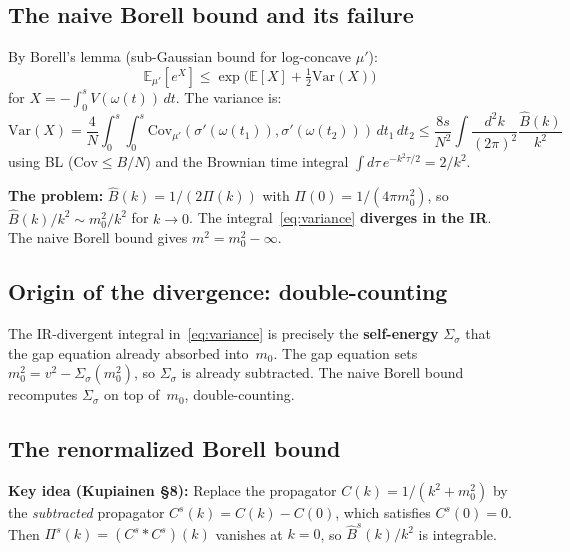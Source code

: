 \documentclass[12pt]{article}
\theoremstyle{definition}
\theoremstyle{remark}
\newcommand{\E}{\mathbb{E}}
\newcommand{\Var}{\mathrm{Var}}
\newcommand{\Cov}{\mathrm{Cov}}
\begin{document}
\subsection{The naive Borell bound and its failure}

By Borell's lemma (sub-Gaussian bound for log-concave $\mu'$):
\begin{equation}
  \E_{\mu'}[e^X] \le \exp\bigl(\E[X]+\tfrac{1}{2}\Var(X)\bigr)
\end{equation}
for $X = -\int_0^s V(\omega(t))\,dt$. The variance is:
\begin{equation}
\label{eq:variance}
  \Var(X) = \frac{4}{N}\!\int_0^s\!\!\!\int_0^s\!
    \Cov_{\mu'}(\sigma'(\omega(t_1)),\sigma'(\omega(t_2)))
    \,dt_1\,dt_2
  \le \frac{8s}{N^2}\!\int\!\frac{d^2k}{(2\pi)^2}
    \frac{\hat B(k)}{k^2}
\end{equation}
using BL ($\Cov \le B/N$) and the Brownian time integral
$\int d\tau\, e^{-k^2\tau/2} = 2/k^2$.

\textbf{The problem:} $\hat B(k) = 1/(2\Pi(k))$ with
$\Pi(0) = 1/(4\pi m_0^2)$, so $\hat B(k)/k^2 \sim m_0^2/k^2$
for $k \to 0$. The integral~\eqref{eq:variance} \textbf{diverges
in the IR}. The naive Borell bound gives $m^2 = m_0^2 - \infty$.

\subsection{Origin of the divergence: double-counting}

The IR-divergent integral in~\eqref{eq:variance} is precisely the
\textbf{self-energy} $\Sigma_\sigma$ that the gap equation already
absorbed into~$m_0$. The gap equation sets
$m_0^2 = v^2 - \Sigma_\sigma(m_0^2)$, so $\Sigma_\sigma$ is
already subtracted. The naive Borell bound recomputes $\Sigma_\sigma$
on top of~$m_0$, double-counting.

\subsection{The renormalized Borell bound}

\textbf{Key idea (Kupiainen \S8):} Replace the propagator $C(k) =
1/(k^2+m_0^2)$ by the \emph{subtracted} propagator
$C^s(k) = C(k) - C(0)$, which satisfies $C^s(0) = 0$. Then
$\Pi^s(k) = (C^s * C^s)(k)$ vanishes at $k=0$, so
$\hat B^s(k)/k^2$ is integrable.
\end{document}
